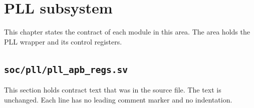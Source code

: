\chapter{PLL subsystem}\label{ds:ch:mod-pll-subsystem}

This chapter states the contract of each module in this area. The area holds the PLL wrapper and its control registers.

\section{\texttt{soc/pll/pll\_apb\_regs.sv}}\label{ds:mod:pll-apb-regs}

This section holds contract text that was in the source file. The text is unchanged. Each line has no leading comment marker and no indentation.

